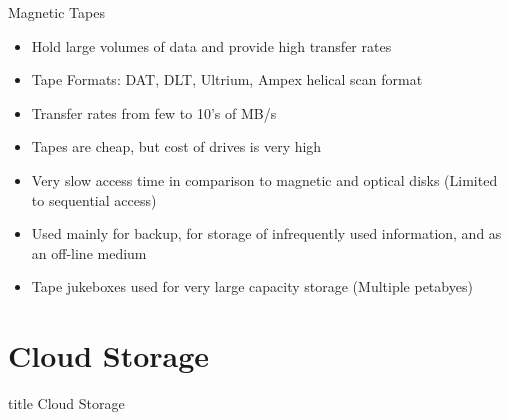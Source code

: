 \documentclass[aspectratio=169, xcolor=dvipsnames]{beamer}
\begin{document}
\begin{frame}{Magnetic Tapes}
    \begin{block}{}
        \begin{itemize}[<+->]
            \item Hold large volumes of data and provide high transfer rates
            \item Tape Formats: DAT, DLT, Ultrium, Ampex helical scan format
            \item Transfer rates from few to 10's of MB/s
            \item Tapes are cheap, but cost of drives is very high
            \item Very slow access time in comparison to magnetic and optical disks (Limited to sequential access)
            \item Used mainly for backup, for storage of infrequently used information, and as an off-line medium
            \item Tape jukeboxes used for very large capacity storage (Multiple petabyes)
        \end{itemize}
    \end{block}
\end{frame}

\section{Cloud Storage}

\begin{frame}
  \vfill
  \centering
  \begin{beamercolorbox}[sep=8pt,center,shadow=true,rounded=true]{title}
    Cloud Storage\par%
  \end{beamercolorbox}
  \vfill
\end{frame}
\end{document}
